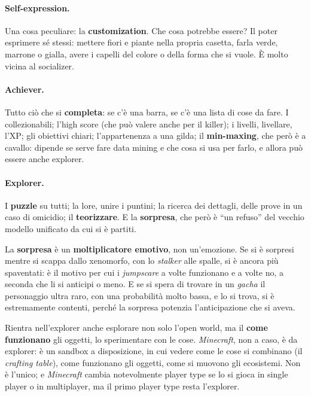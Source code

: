 \paragraph{Self-expression.} Una cosa peculiare: la \textbf{customization}. Che cosa
potrebbe essere? Il poter esprimere sé stessi: mettere fiori e piante nella propria
casetta, farla verde, marrone o gialla, avere i capelli del colore o della forma che
si vuole. È molto vicina al socializer.

\paragraph{Achiever.} Tutto ciò che si \textbf{completa}: se c'è una barra, se c'è una
lista di cose da fare. I collezionabili; l'high score (che può valere anche per il
killer); i livelli, livellare, l'XP; gli obiettivi chiari; l'appartenenza a una
gilda; il \textbf{min-maxing}, che però è a cavallo: dipende se serve fare data
mining e che cosa si usa per farlo, e allora può essere anche explorer.

\paragraph{Explorer.} I \textbf{puzzle} su tutti; la lore, unire i puntini; la ricerca
dei dettagli, delle prove in un caso di omicidio; il \textbf{teorizzare}. E la
\textbf{sorpresa}, che però è ``un refuso'' del vecchio modello unificato da cui si è
partiti.

\begin{remark}
La \textbf{sorpresa} è un \textbf{moltiplicatore emotivo}, non un'emozione. Se si è
sorpresi mentre si scappa dallo xenomorfo, con lo \emph{stalker} alle spalle, si è
ancora più spaventati: è il motivo per cui i \emph{jumpscare} a volte funzionano e a
volte no, a seconda che li si anticipi o meno. E se si spera di trovare in un
\emph{gacha} il personaggio ultra raro, con una probabilità molto bassa, e lo si
trova, si è estremamente contenti, perché la sorpresa potenzia l'anticipazione che
si aveva.
\end{remark}

Rientra nell'explorer anche esplorare non solo l'open world, ma il \textbf{come
funzionano} gli oggetti, lo sperimentare con le cose. \emph{Minecraft}, non a caso,
è da explorer: è un sandbox a disposizione, in cui vedere come le cose si combinano
(il \emph{crafting table}), come funzionano gli oggetti, come si muovono gli
ecosistemi. Non è l'unico; e \emph{Minecraft} cambia notevolmente player type se lo
si gioca in single player o in multiplayer, ma il primo player type resta l'explorer.

